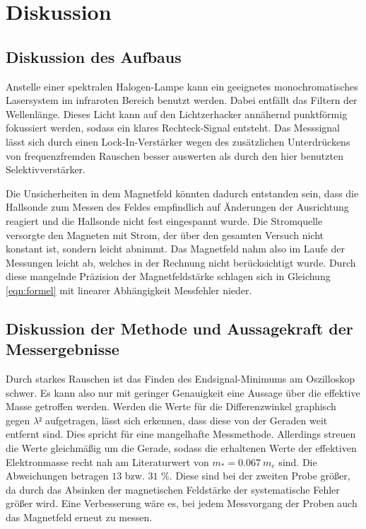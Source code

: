 \section{Diskussion}
\label{sec:Diskussion}
\subsection{Diskussion des Aufbaus}
Anstelle einer spektralen Halogen-Lampe kann ein geeignetes  monochromatisches Lasersystem im infraroten Bereich benutzt werden.
Dabei entfällt das Filtern der Wellenlänge.
Dieses Licht kann auf den Lichtzerhacker annähernd punktförmig fokussiert werden, sodass ein klares Rechteck-Signal entsteht.
Das Messsignal lässt sich durch einen Lock-In-Verstärker wegen des zusätzlichen Unterdrückens von frequenzfremden Rauschen besser auswerten als durch den hier benutzten Selektivverstärker.

Die Unsicherheiten in dem Magnetfeld könnten dadurch entstanden sein, dass die Hallsonde zum Messen des Feldes empfindlich auf Änderungen der Ausrichtung reagiert und die Hallsonde nicht fest eingespannt wurde.
Die Stromquelle versorgte den Magneten mit Strom, der über den gesamten Versuch nicht konstant ist, sondern leicht abnimmt.
Das Magnetfeld nahm also im Laufe der Messungen leicht ab, welches in der Rechnung nicht berücksichtigt wurde.
Durch diese mangelnde Präzision der Magnetfeldstärke schlagen sich in Gleichung \eqref{eqn:formel} mit linearer Abhängigkeit Messfehler nieder.

\subsection{Diskussion der Methode und Aussagekraft der Messergebnisse}
Durch starkes Rauschen ist das Finden des Endsignal-Minimums am Oszilloskop schwer. Es kann also nur mit geringer Genauigkeit eine Aussage über die effektive Masse getroffen werden.
Werden die Werte für die Differenzwinkel graphisch gegen $\lambda²$ aufgetragen, lässt sich erkennen, dass diese von der Geraden weit entfernt sind. Dies spricht für eine mangelhafte Messmethode. Allerdings streuen die Werte gleichmäßig um die Gerade, sodass die erhaltenen Werte der effektiven Elektronmasse recht nah am Literaturwert von $m_* = \SI{0.067}{m_e}$ \cite{Hurensohn3} sind.
Die Abweichungen betragen $13$ bzw. $31$ $\%$.
Diese sind bei der zweiten Probe größer, da durch das Absinken der magnetischen Feldstärke der systematische Fehler größer wird.
Eine Verbesserung wäre es, bei jedem Messvorgang der Proben auch das Magnetfeld erneut zu messen.

